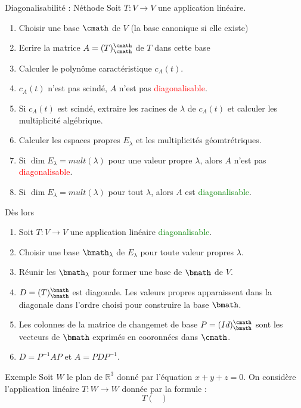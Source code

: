 \begin{parag}{Diagonalisabilité : Néthode}
    Soit $T : V \to V$ une application linéaire.
    \begin{enumerate}
        \item Choisir une base $\cmath$ de $V$ (la base canonique si elle existe)
        \item Ecrire la matrice $A = (T)_{\cmath}^\cmath$ de $T$ dans cette base
        \item Calculer le polynôme caractéristique $c_A(t)$.
        \item $c_A(t)$ n'est pas scindé, $A$ n'est pas \textcolor{red}{diagonalisable}.
        \item Si $c_A(t)$ est scindé, extraire les racines de $\lambda$ de $c_A(t)$ et calculer les multiplicité algébrique.
        \item Calculer les espaces propres $E_\lambda$ et les multiplicités géomtrétriques.
        \item Si $\dim E_\lambda = mult(\lambda)$ pour une valeur propre $\lambda$, alors $A$ n'est pas \textcolor{red}{diagonalisable}.
        \item Si $\dim E_\lambda = mult(\lambda)$ pour tout $\lambda$, alors $A$ est \textcolor{green}{diagonalisable}.
    \end{enumerate}
    Dès lors
    \begin{enumerate}
        \item Soit $T : V \to V$ une application linéaire \textcolor{green}{diagonalisable}.
        \item Choisir une base $\bmath_\lambda$ de $E_\lambda$ pour toute valeur propres $\lambda$.
        \item Réunir les $\bmath_\lambda$ pour former une base de $\bmath$ de $V$.
        \item $D = (T)_\bmath^\bmath$ est diagonale. Les valeurs propres apparaissent dans la diagonale dans l'ordre choisi pour construire la base $\bmath$.
        \item Les colonnes de la matrice de changemet de base $P = (Id)_\bmath^\cmath$ sont les vecteurs de $\bmath$ exprimés en cooronnées dans $\cmath$.
        \item $D = P^{-1}AP$ et $A = PDP^{-1}$.
    \end{enumerate}
    \begin{subparag}{Exemple}
        Soit $W$ le plan de $\mathbb{R}^3$ donné par l'équation $x + y + z = 0$. On considère l'application linéaire $T: W \to W$ donnée par la formule :
        \[T\begin{pmatrix}

\end{pmatrix}\]
\end{subparag}
\end{parag}
